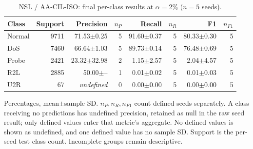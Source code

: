 \begin{table}[t]
\centering\scriptsize
\setlength{\tabcolsep}{3.3pt}
\caption{NSL / AA-CIL-ISO: final per-class results at $\alpha=2\%$ ($n=5$ seeds).}\label{tab:forgetting-class-nsl_kdd-aacil-iso}
\begin{tabular}{lrrrrrrr}
\toprule
Class & Support & Precision & $n_P$ & Recall & $n_R$ & F1 & $n_{F1}$ \\
\midrule
Normal & 9711 & 71.53$\pm$0.25 & 5 & 91.60$\pm$0.37 & 5 & 80.33$\pm$0.30 & 5 \\
DoS & 7460 & 66.64$\pm$1.03 & 5 & 89.73$\pm$0.14 & 5 & 76.48$\pm$0.69 & 5 \\
Probe & 2421 & 23.32$\pm$32.98 & 2 & 1.15$\pm$2.57 & 5 & 2.04$\pm$4.57 & 5 \\
R2L & 2885 & 50.00$\pm$-- & 1 & 0.01$\pm$0.02 & 5 & 0.01$\pm$0.03 & 5 \\
U2R & 67 & \textit{undefined} & 0 & 0.00$\pm$0.00 & 5 & 0.00$\pm$0.00 & 5 \\
\bottomrule
\end{tabular}
\par\smallskip\begin{minipage}{0.98\textwidth}\scriptsize Percentages, mean$\pm$sample SD. $n_P,n_R,n_{F1}$ count defined seeds separately. A class receiving no predictions has undefined precision, retained as null in the raw seed result; only defined values enter that metric's aggregate. No defined values is shown as undefined, and one defined value has no sample SD. Support is the per-seed test class count. Incomplete groups remain descriptive.\end{minipage}
\end{table}


